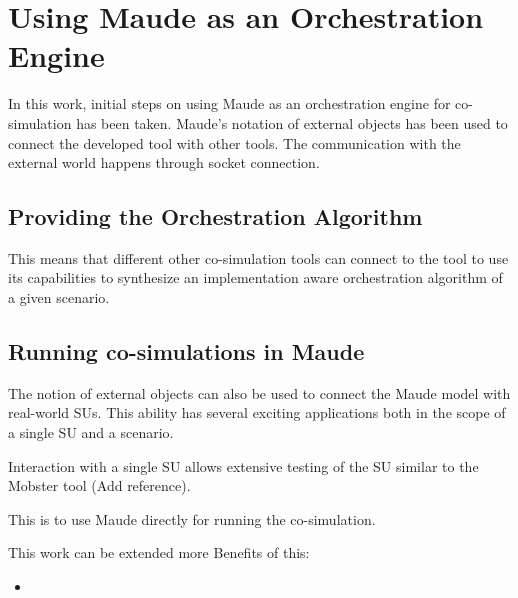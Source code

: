 \section{Using Maude as an Orchestration Engine}
In this work, initial steps on using Maude as an orchestration engine for co-simulation has been taken.
Maude's notation of external objects  has been used to connect the developed tool with other tools. 
The communication with the external world happens through socket connection.

\subsection{Providing the Orchestration Algorithm}

This means that different other co-simulation tools can connect to the tool to use its capabilities to synthesize an implementation aware orchestration algorithm of a given scenario.

\subsection{Running co-simulations in Maude}
The notion of external objects can also be used to connect the Maude model with real-world SUs.
This ability has several exciting applications both in the scope of a single SU and a scenario.

Interaction with a single SU allows extensive testing of the SU similar to the Mobster tool (Add reference).  

This is to use Maude directly for running the co-simulation.


This work can be extended more 
Benefits of this:
\begin{itemize}
    \item 
\end{itemize}